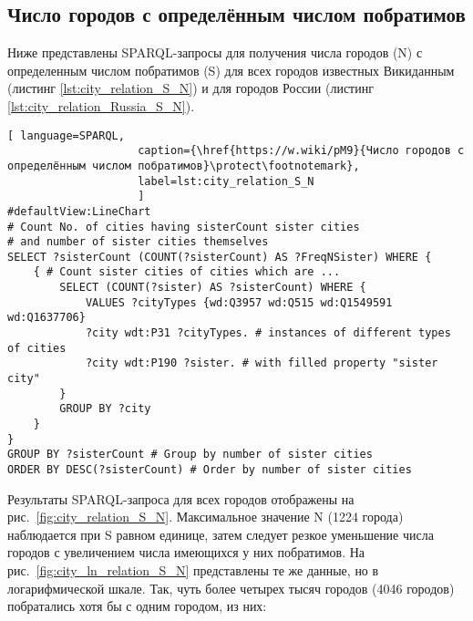 \subsection{Число городов с определённым числом побратимов}

Ниже представлены SPARQL-запросы для получения числа городов (N) с определенным числом побратимов (S) для всех городов известных Викиданным (листинг \ref{lst:city_relation_S_N}) и для городов России (листинг \ref{lst:city_relation_Russia_S_N}).


\begin{lstlisting}[ language=SPARQL, 
                    caption={\href{https://w.wiki/pM9}{Число городов с определённым числом побратимов}\protect\footnotemark},
                    label=lst:city_relation_S_N
                    ]
#defaultView:LineChart
# Count No. of cities having sisterCount sister cities 
# and number of sister cities themselves
SELECT ?sisterCount (COUNT(?sisterCount) AS ?FreqNSister) WHERE {                                                                         
	{ # Count sister cities of cities which are ...
		SELECT (COUNT(?sister) AS ?sisterCount) WHERE {        
			VALUES ?cityTypes {wd:Q3957 wd:Q515 wd:Q1549591 wd:Q1637706}
			?city wdt:P31 ?cityTypes. # instances of different types of cities
			?city wdt:P190 ?sister. # with filled property "sister city"
		}
		GROUP BY ?city
	}
}
GROUP BY ?sisterCount # Group by number of sister cities                                     
ORDER BY DESC(?sisterCount) # Order by number of sister cities   
\end{lstlisting}

Результаты SPARQL-запроса для всех городов отображены на рис.~\ref{fig:city_relation_S_N}. Максимальное значение N (\num{1224} города) наблюдается при S равном единице, затем следует резкое уменьшение числа городов с увеличением числа имеющихся у них побратимов. На рис.~\ref{fig:city_ln_relation_S_N} представлены те же данные, но в логарифмической шкале. Так, чуть более четырех тысяч городов (\num{4046} городов) побратались хотя бы с одним городом, из них:

